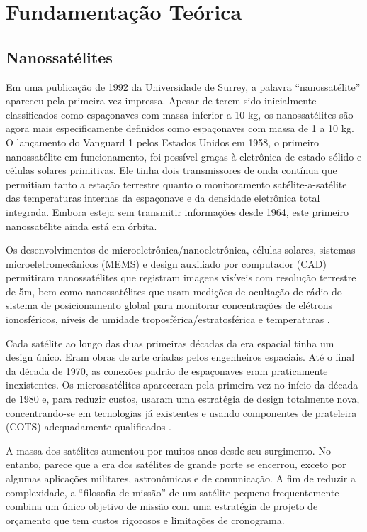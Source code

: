 \documentclass[
	12pt,				%
	openright,			%
	twoside,			%
	a4paper,			%
	english,			%
	french,				%
	spanish,			%
	brazil				%
	]{abntex2}
\newcommand{\quotes}[1]{``#1''}
\begin{document}

\chapter{Fundamentação Teórica}

\section{Nanossatélites}

Em uma publicação de 1992 da Universidade de Surrey, a palavra \quotes{nanossatélite} apareceu pela primeira vez impressa. Apesar de terem sido inicialmente classificados como espaçonaves com massa inferior a 10 kg, os nanossatélites são agora mais especificamente definidos como espaçonaves com massa de 1 a 10 kg. O lançamento do Vanguard 1 pelos Estados Unidos em 1958, o primeiro nanossatélite em funcionamento, foi possível graças à eletrônica de estado sólido e células solares primitivas. Ele tinha dois transmissores de onda contínua que permitiam tanto a estação terrestre quanto o monitoramento satélite-a-satélite das temperaturas internas da espaçonave e da densidade eletrônica total integrada. Embora esteja sem transmitir informações desde 1964, este primeiro nanossatélite ainda está em órbita.

Os desenvolvimentos de microeletrônica/nanoeletrônica, células solares, sistemas microeletromecânicos (MEMS) e design auxiliado por computador (CAD) permitiram nanossatélites que registram imagens visíveis com resolução terrestre de 5m, bem como nanossatélites que usam medições de ocultação de rádio do sistema de posicionamento global para monitorar concentrações de elétrons ionosféricos, níveis de umidade troposférica/estratosférica e temperaturas \cite{carvalho_2020}.

Cada satélite ao longo das duas primeiras décadas da era espacial tinha um design único. Eram obras de arte criadas pelos engenheiros espaciais. Até o final da década de 1970, as conexões padrão de espaçonaves eram praticamente inexistentes. Os microssatélites apareceram pela primeira vez no início da década de 1980 e, para reduzir custos, usaram uma estratégia de design totalmente nova, concentrando-se em tecnologias já existentes e usando componentes de prateleira (COTS) adequadamente qualificados \cite{camps_2019}.

A massa dos satélites aumentou por muitos anos desde seu surgimento. No entanto, parece que a era dos satélites de grande porte se encerrou, exceto por algumas aplicações militares, astronômicas e de comunicação. A fim de reduzir a complexidade, a \quotes{filosofia de missão} de um satélite pequeno frequentemente combina um único objetivo de missão com uma estratégia de projeto de orçamento que tem custos rigorosos e limitações de cronograma.
\end{document}
